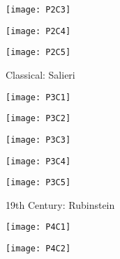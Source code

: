 \begin{figure}
\centering
\begin{minipage}{.5\textwidth}
  \centering
  \texttt{[image: P2C3]}
  \label{fig:test1}
\end{minipage}%
\begin{minipage}{.5\textwidth}
  \centering
  \texttt{[image: P2C4]}
  \label{fig:test2}
\end{minipage}
\end{figure}

\begin{figure}[h]
\caption{Classical: Salieri}
\centering
\texttt{[image: P2C5]}
\end{figure}

\begin{figure}
\centering
\begin{minipage}{.5\textwidth}
  \centering
  \texttt{[image: P3C1]}
  \label{fig:test1}
\end{minipage}%
\begin{minipage}{.5\textwidth}
  \centering
  \texttt{[image: P3C2]}
  \label{fig:test2}
\end{minipage}
\end{figure}

\begin{figure}
\centering
\begin{minipage}{.5\textwidth}
  \centering
  \texttt{[image: P3C3]}
  \label{fig:test1}
\end{minipage}%
\begin{minipage}{.5\textwidth}
  \centering
  \texttt{[image: P3C4]}
  \label{fig:test2}
\end{minipage}
\end{figure}

\begin{figure}[h]
\caption{19th Century: Rubinstein}
\centering
\texttt{[image: P3C5]}
\end{figure}

\begin{figure}
\centering
\begin{minipage}{.5\textwidth}
  \centering
  \texttt{[image: P4C1]}
  \label{fig:test1}
\end{minipage}%
\begin{minipage}{.5\textwidth}
  \centering
  \texttt{[image: P4C2]}
  \label{fig:test2}
\end{minipage}
\end{figure}

